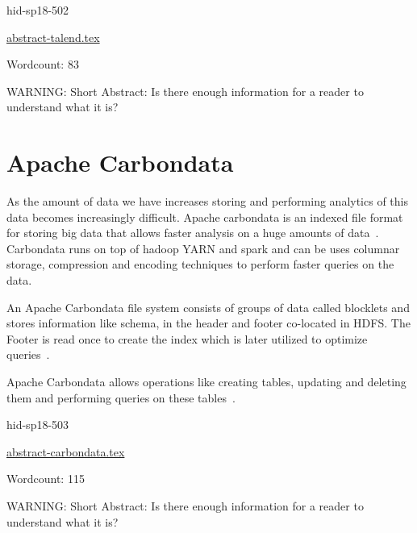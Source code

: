 \begin{IU}

hid-sp18-502

\href{https://github.com/cloudmesh-community/hid-sp18-502/blob/master//technology/abstract-talend.tex}{abstract-talend.tex}

 

Wordcount: 83

WARNING: Short Abstract: Is there enough information for a reader to understand what it is?

\end{IU}

\section{Apache Carbondata}

As the amount of data we have increases storing and performing
analytics of this data becomes increasingly difficult.
Apache carbondata is an indexed file format for storing big data
that allows faster analysis on a huge amounts of 
data~\cite{hid-sp18-503-www-carbondata-docs}. 
Carbondata runs on top of hadoop YARN
and spark and can be uses columnar storage, compression and
encoding techniques to perform faster queries on the data.

An Apache Carbondata file system consists of groups of data called blocklets
and stores information like schema, in the header and footer co-located in HDFS.
The Footer is read once to create the index which is later utilized to optimize 
queries~\cite{hid-sp18-503-www-carbondata-docs}.

Apache Carbondata allows operations like creating tables, updating and
deleting them and performing queries on these 
tables~\cite{hid-sp18-503-www-carbondata-mgmt}.





\begin{IU}

hid-sp18-503

\href{https://github.com/cloudmesh-community/hid-sp18-503/blob/master//technology/abstract-carbondata.tex}{abstract-carbondata.tex}

 

Wordcount: 115

WARNING: Short Abstract: Is there enough information for a reader to understand what it is?

\end{IU}

